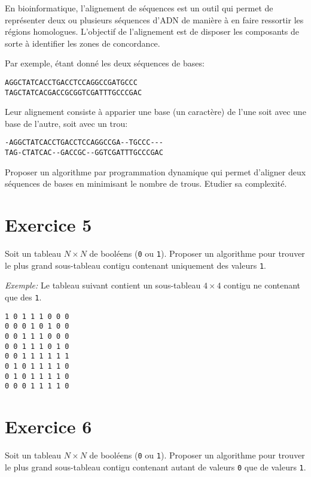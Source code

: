 \documentclass[a4paper,10pt]{article}
\begin{document}
En bioinformatique, l'alignement de séquences est un outil qui permet de représenter
deux ou plusieurs séquences d'ADN de manière à en faire ressortir les régions
homologues. L'objectif de l'alignement est de disposer les composants de sorte
à identifier les zones de concordance.

Par exemple, étant donné les deux séquences de bases:

\begin{verbatim}
AGGCTATCACCTGACCTCCAGGCCGATGCCC
TAGCTATCACGACCGCGGTCGATTTGCCCGAC
\end{verbatim}

Leur alignement consiste à apparier une base (un caractère) de l'une
soit avec une base de l'autre, soit avec un trou:

\begin{verbatim}
-AGGCTATCACCTGACCTCCAGGCCGA--TGCCC---
TAG-CTATCAC--GACCGC--GGTCGATTTGCCCGAC
\end{verbatim}

Proposer un algorithme par programmation dynamique qui permet
d'aligner deux séquences de bases en minimisant le nombre de trous. Etudier sa complexité.



\section*{Exercice 5}

Soit un tableau $N \times N$ de booléens (\texttt{0} ou
\texttt{1}). Proposer un algorithme pour trouver le plus grand
sous-tableau contigu contenant uniquement des valeurs \texttt{1}.

\textit{Exemple:} Le tableau suivant contient un sous-tableau $4 \times 4$ contigu ne contenant que des \texttt{1}.

\begin{verbatim}
1 0 1 1 1 0 0 0
0 0 0 1 0 1 0 0
0 0 1 1 1 0 0 0
0 0 1 1 1 0 1 0
0 0 1 1 1 1 1 1
0 1 0 1 1 1 1 0
0 1 0 1 1 1 1 0
0 0 0 1 1 1 1 0
\end{verbatim}


\section*{Exercice 6}

Soit un tableau $N \times N$ de booléens (\texttt{0} ou \texttt{1}). Proposer un algorithme pour trouver le plus grand sous-tableau contigu contenant autant de valeurs \texttt{0} que de valeurs \texttt{1}.
\end{document}
